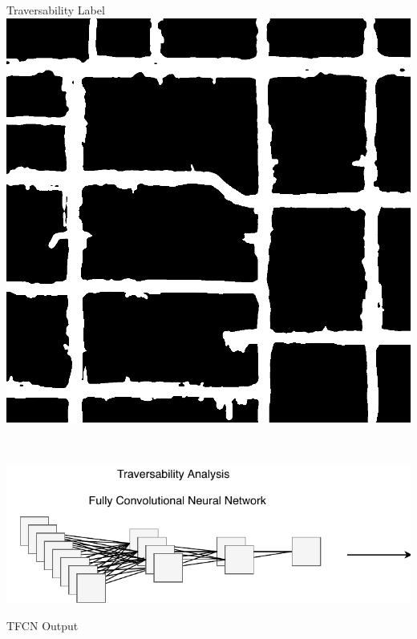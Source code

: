 \documentclass[usenames,dvipsnames,10pt]{beamer}
\begin{document}
\begin{frame}
\begin{minipage}[]{0.3\textwidth}
\end{minipage}
\hspace{0.25cm}
\begin{minipage}[]{0.3\textwidth}
\centering
Traversability Label
\includegraphics[width=\textwidth]{graphics/aerial01-trav.jpg}
\end{minipage} \\
\vspace{0.25cm}
\begin{minipage}[]{0.666\textwidth}
\includegraphics[width=\textwidth]{graphics/tfcn2.pdf}
\end{minipage}
\begin{minipage}[]{0.3\textwidth}
\centering
TFCN Output

\end{minipage}
\end{frame}
\end{document}
